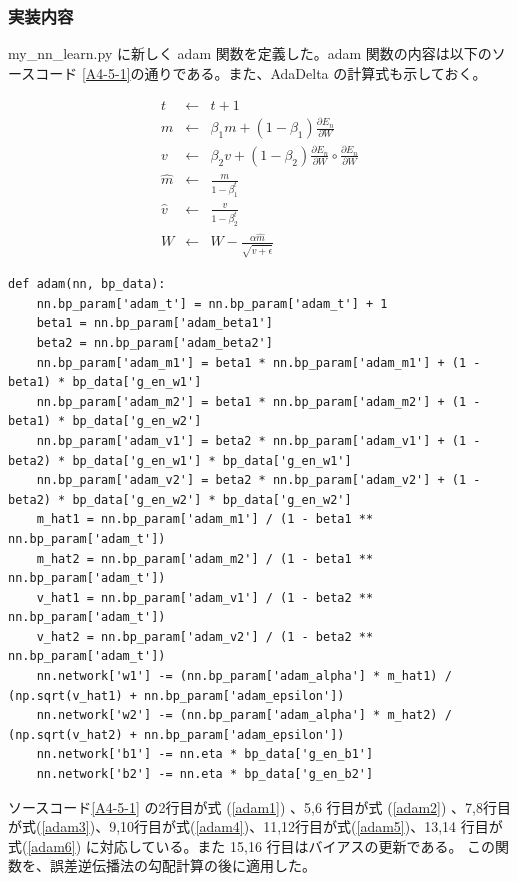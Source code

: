 \documentclass[a4paper,dvipdfmx]{jsarticle}
\begin{document}
\subsubsection*{実装内容}
my\_nn\_learn.py に新しく adam 関数を定義した。adam 関数の内容は以下のソースコード \ref{A4-5-1}の通りである。また、AdaDelta の計算式も示しておく。

\begin{eqnarray}
	\label{adam1}
	t & \leftarrow & t + 1 \\
	\label{adam2}
	m & \leftarrow & \beta_1 m + (1-\beta_1)\frac{\partial E_n}{\partial W} \\
	\label{adam3}
	v & \leftarrow & \beta_2 v + (1-\beta_2)\frac{\partial E_n}{\partial W} \circ \frac{\partial E_n}{\partial W}\\
	\label{adam4}
	\hat{m} & \leftarrow & \frac{m}{1-\beta_1^t}\\
	\label{adam5}
	\hat{v} & \leftarrow & \frac{v}{1-\beta_2^t}\\
	\label{adam6}
	W & \leftarrow & W - \frac{\alpha \hat{m}}{\sqrt{\hat{v} + \epsilon}}
\end{eqnarray}
\begin{lstlisting}[caption="Adam",label=A4-5-1]
def adam(nn, bp_data):
    nn.bp_param['adam_t'] = nn.bp_param['adam_t'] + 1
    beta1 = nn.bp_param['adam_beta1']
    beta2 = nn.bp_param['adam_beta2']
    nn.bp_param['adam_m1'] = beta1 * nn.bp_param['adam_m1'] + (1 - beta1) * bp_data['g_en_w1']
    nn.bp_param['adam_m2'] = beta1 * nn.bp_param['adam_m2'] + (1 - beta1) * bp_data['g_en_w2']
    nn.bp_param['adam_v1'] = beta2 * nn.bp_param['adam_v1'] + (1 - beta2) * bp_data['g_en_w1'] * bp_data['g_en_w1']
    nn.bp_param['adam_v2'] = beta2 * nn.bp_param['adam_v2'] + (1 - beta2) * bp_data['g_en_w2'] * bp_data['g_en_w2']
    m_hat1 = nn.bp_param['adam_m1'] / (1 - beta1 ** nn.bp_param['adam_t'])
    m_hat2 = nn.bp_param['adam_m2'] / (1 - beta1 ** nn.bp_param['adam_t'])
    v_hat1 = nn.bp_param['adam_v1'] / (1 - beta2 ** nn.bp_param['adam_t'])
    v_hat2 = nn.bp_param['adam_v2'] / (1 - beta2 ** nn.bp_param['adam_t'])
    nn.network['w1'] -= (nn.bp_param['adam_alpha'] * m_hat1) / (np.sqrt(v_hat1) + nn.bp_param['adam_epsilon'])
    nn.network['w2'] -= (nn.bp_param['adam_alpha'] * m_hat2) / (np.sqrt(v_hat2) + nn.bp_param['adam_epsilon'])
    nn.network['b1'] -= nn.eta * bp_data['g_en_b1']
    nn.network['b2'] -= nn.eta * bp_data['g_en_b2']
\end{lstlisting}

ソースコード\ref{A4-5-1} の2行目が式 (\ref{adam1}) 、5,6 行目が式 (\ref{adam2}) 、7,8行目が式(\ref{adam3})、9,10行目が式(\ref{adam4})、11,12行目が式(\ref{adam5})、13,14 行目が式(\ref{adam6}) に対応している。また 15,16 行目はバイアスの更新である。
この関数を、誤差逆伝播法の勾配計算の後に適用した。
\end{document}
